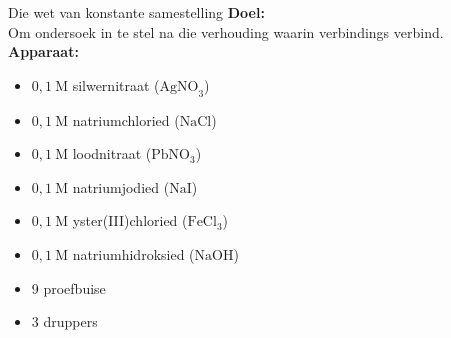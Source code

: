\begin{Investigation}{Die wet van konstante samestelling}
 \textbf{Doel:} \\
Om ondersoek in te stel na die verhouding waarin verbindings verbind. \\
\textbf{Apparaat:} \\
\begin{minipage}{.4\textwidth}
\begin{itemize}[noitemsep]
\item $0,1~\text{M}$ silwernitraat ($\text{AgNO}_3$)
\item $0,1~\text{M}$ natriumchloried ($\text{NaCl}$)
\item $0,1~\text{M}$ loodnitraat ($\text{PbNO}_{3}$)
\item $0,1~\text{M}$ natriumjodied ($\text{NaI}$)
\item $0,1~\text{M}$ yster(III)chloried ($\text{FeCl}_{3}$)
\item $0,1~\text{M}$ natriumhidroksied ($\text{NaOH}$)
\item 9 proefbuise
\item 3 druppers
\end{itemize}
\end{minipage} 
\begin{minipage}{.6\textwidth}
 \begin{center}
 \end{center}
\end{minipage}

\end{Investigation}
